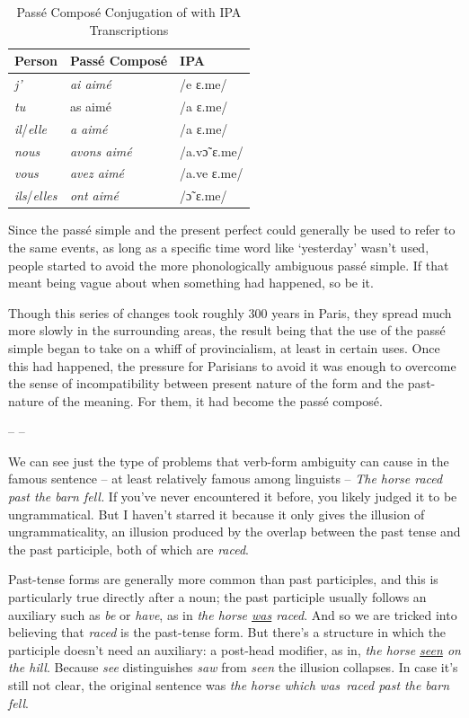 \begin{table}[h]
\centering
\begin{tabular}{lll}
\hline
\textbf{Person} & \textbf{Passé Composé} & \textbf{IPA} \\
\hline
\textit{j'} & \textit{ai aimé} &/e ɛ.me/ \\
\textit{tu} & as aimé &/a ɛ.me/ \\
\textit{il}/\textit{elle} & \textit{a aimé } & /a ɛ.me/ \\
\textit{nous} & \textit{avons aimé} & /a.vɔ̃ ɛ.me/ \\
\textit{vous} & \textit{avez aimé} & /a.ve ɛ.me/ \\
\textit{ils}/\textit{elles} & \textit{ont aimé} & /ɔ̃ ɛ.me/ \\
\hline
\end{tabular}
\caption{Passé Composé Conjugation of  with IPA Transcriptions}
\end{table}

Since the passé simple and the present perfect could generally be used to refer to the same events, as long as a specific time word like  `yesterday' wasn't used, people started to avoid the more phonologically ambiguous passé simple. If that meant being vague about when something had happened, so be it.

Though this series of changes took roughly 300 years in Paris, they spread much more slowly in the surrounding areas, the result being that the use of the passé simple began to take on a whiff of provincialism, at least in certain uses. Once this had happened, the pressure for Parisians to avoid it was enough to overcome the sense of incompatibility between present nature of the form and the past-nature of the meaning. For them, it had become the passé composé.

\begin{center}
    -- --
\end{center}

We can see just the type of problems that verb-form ambiguity can cause in the famous sentence -- at least relatively famous among linguists -- \textit{The horse raced past the barn fell.} If you've never encountered it before, you likely judged it to be ungrammatical. But I haven't starred it because it only gives the illusion of ungrammaticality, an illusion produced by the overlap between the past tense and the past participle, both of which are \textit{raced}.

Past-tense forms are generally more common than past participles, and this is particularly true directly after a noun; the past participle usually follows an auxiliary such as \textit{be} or \textit{have}, as in \textit{the horse \uline{was} raced}. And so we are tricked into believing that \textit{raced} is the past-tense form. But there's a structure in which the participle doesn't need an auxiliary: a post-head modifier, as in, \textit{the horse \uline{seen} on the hill}. Because \textit{see} distinguishes \textit{saw} from \textit{seen} the illusion collapses. In case it's still not clear, the original sentence was \textit{the horse \op which was\cp~raced past the barn fell}.

